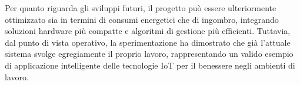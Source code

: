 \documentclass[fleqn,10pt]{SelfArx} %
\begin{document}
Per quanto riguarda gli sviluppi futuri, il progetto può essere ulteriormente ottimizzato sia in termini di consumi energetici che di ingombro, integrando soluzioni hardware più compatte e algoritmi di gestione più efficienti. Tuttavia, dal punto di vista operativo, la sperimentazione ha dimostrato che già l'attuale sistema svolge egregiamente il proprio lavoro, rappresentando un valido esempio di applicazione intelligente delle tecnologie IoT per il benessere negli ambienti di lavoro. \newline





\end{document}
